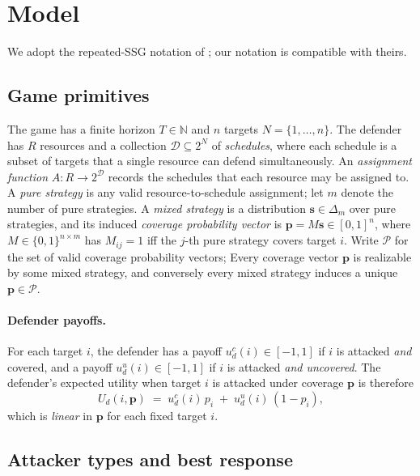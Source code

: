 \documentclass[letterpaper,9pt,twocolumn]{extarticle}
\newcommand{\pvec}{\mathbf{p}}
\newcommand{\svec}{\mathbf{s}}
\newcommand{\cP}{\mathcal{P}}
\newcommand{\NN}{\mathbb{N}}
\theoremstyle{plain}
\theoremstyle{definition}
\theoremstyle{remark}
\begin{document}
\section{Model}
\label{sec:model}

We adopt the repeated-SSG notation of \citet[Sec.~2]{balcan2015}; our
notation is compatible with theirs.

\subsection{Game primitives}

The game has a finite horizon $T\in\NN$ and $n$ targets
$N=\{1,\dots,n\}$. The defender has $R$ resources and a collection
$\mathcal{D}\subseteq 2^N$ of \emph{schedules}, where each schedule is a
subset of targets that a single resource can defend simultaneously. An
\emph{assignment function} $A:R\to 2^{\mathcal{D}}$ records the schedules
that each resource may be assigned to. A \emph{pure strategy} is any valid
resource-to-schedule assignment; let $m$ denote the number of pure
strategies. A \emph{mixed strategy} is a distribution $\svec\in\Delta_m$
over pure strategies, and its induced \emph{coverage probability vector}
is $\pvec = M\svec\in [0,1]^n$, where $M\in\{0,1\}^{n\times m}$ has
$M_{ij}=1$ iff the $j$-th pure strategy covers target $i$. Write $\cP$ for
the set of valid coverage probability vectors;  Every coverage vector $\pvec$ is realizable by
some mixed strategy, and conversely every mixed strategy induces a unique
$\pvec\in\cP$.

\paragraph{Defender payoffs.}
For each target $i$, the defender has a payoff
$u_d^c(i)\in[-1,1]$ if $i$ is attacked \emph{and} covered, and a payoff
$u_d^u(i)\in[-1,1]$ if $i$ is attacked \emph{and uncovered}. The
defender's expected utility when target $i$ is attacked under coverage
$\pvec$ is therefore
\begin{equation}
U_d(i,\pvec)\;=\;u_d^c(i)\,p_i \;+\; u_d^u(i)\,(1-p_i),
\label{eq:Ud}
\end{equation}
which is \emph{linear} in $\pvec$ for each fixed target $i$.

\subsection{Attacker types and best response}
\end{document}
